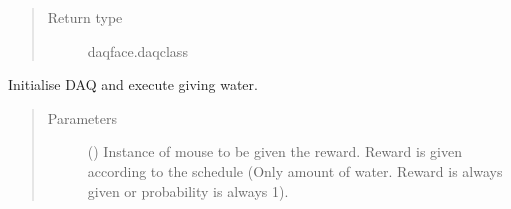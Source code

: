 \documentclass[letterpaper,10pt,english]{sphinxmanual}
\begin{document}
\begin{fulllineitems}
\begin{fulllineitems}
\begin{quote}
\begin{description}
\item[{Return type}] \leavevmode
\sphinxAtStartPar
daqface.daq\sphinxhyphen{}class

\end{description}\end{quote}

\end{fulllineitems}


\begin{fulllineitems}
\label{\detokenize{NoSeMazeControl/Controllers:Controllers.ExperimentControl.ExperimentWorker.reward}}
\pysigstartsignatures
{}
\pysigstopsignatures
\sphinxAtStartPar
Initialise DAQ and execute giving water.
\begin{quote}\begin{description}
\item[{Parameters}] \leavevmode
\sphinxAtStartPar
{} () \textendash{} Instance of mouse to be given the reward. Reward is given according
to the schedule (Only amount of water. Reward is always given or
probability is always 1).

\end{description}\end{quote}

\end{fulllineitems}



\end{fulllineitems}
\end{document}
